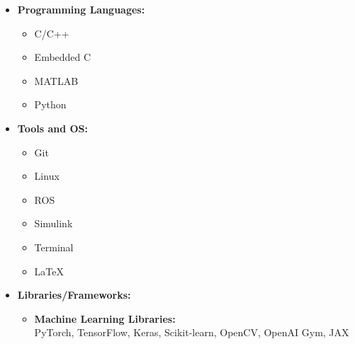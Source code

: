 \documentclass[12pt]{article}
\begin{document}
\begin{itemize} \itemsep -12pt
	\item \textbf{Programming Languages:}
	\vspace{-8pt}
	\begin{multicols}{4}
		\begin{itemize}

			\item C/C++
			\item Embedded C
			\item MATLAB
			\item Python
		\end{itemize}
	\end{multicols}
	\item \textbf{Tools and OS:}
	\vspace{-8pt}
	\begin{multicols}{3}
		\begin{itemize}
			\item Git \faGit*
			\item Linux \faLinux
			\item ROS
			\item Simulink
			\item Terminal \faTerminal
			\item \LaTeX
		\end{itemize}
	\end{multicols}
	\item \textbf{Libraries/Frameworks:}
	\vspace{-8pt}
	\begin{itemize}
		\item \textbf{Machine Learning Libraries:}\\
		PyTorch, TensorFlow, Keras, Scikit-learn, OpenCV, OpenAI Gym, JAX

\end{itemize}
\end{itemize}
\end{document}
